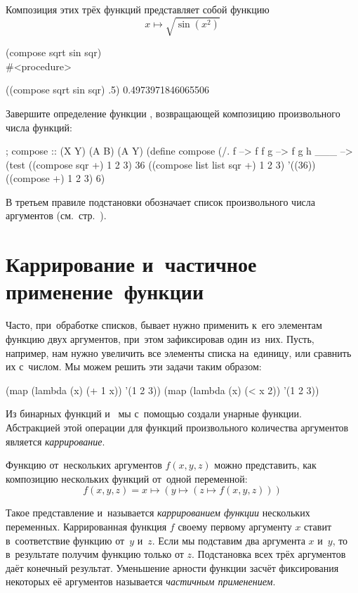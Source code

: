 \begin{example}{%
Композиция этих трёх функций представляет собой функцию $$x\mapsto\sqrt{\sin(x^2)}$$}

\REPL
  {(compose sqrt sin sqr)} 
  {\\\#<procedure>}

\REPL
  {((compose sqrt sin sqr) .5)}
  {0.4973971846065506}
\end{example}

\begin{Assignment}
Завершите определение функции , возвращающей композицию произвольного числа функций:
\begin{Specification}
; compose :: (X \arrow Y) \ddd (A \ddd \arrow B) \arrow (A \ddd \arrow Y)
(define compose
  (/. f --> f
      f g --> %
      f g h ___ --> %
(test
  ((compose sqr +) 1 2 3)            36
  ((compose list list sqr +) 1 2 3)  '((36))
  ((compose +) 1 2 3)                6)
\end{Specification}
В третьем правиле подстановки  обозначает список произвольного числа аргументов (см.~стр.~\pageref{variadic-rewrite}).
\end{Assignment}


\section[4]{Каррирование и~частичное применение~функции}%
Часто, при~обработке списков, бывает нужно применить к~его элементам функцию двух аргументов, при~этом зафиксировав один из~них. Пусть, например, нам нужно увеличить все элементы списка на~единицу, или сравнить их с~числом. Мы можем решить эти задачи таким образом:

\begin{SchemeCode}
(map (lambda (x) (+ 1 x)) '(1 2 3))
(map (lambda (x) (< x 2)) '(1 2 3))
\end{SchemeCode}

Из бинарных функций \s{+} и~\s{<} мы с~помощью  создали унарные функции. Абстракцией этой операции для функций произвольного количества аргументов является \emph{каррирование}.

Функцию от~нескольких аргументов $f(x, y, z)$ можно представить, как композицию нескольких функций от~одной переменной:$$f(x, y, z) = x \mapsto (y \mapsto (z \mapsto f (x, y, z)))$$

Такое представление и~называется \emph{каррированием функции} нескольких переменных. Каррированная функция $f$ своему первому аргументу $x$ ставит в~соответствие функцию от~$y$ и~$z$. Если мы подставим два аргумента $x$ и~$y$, то в~результате получим функцию только от $z$. Подстановка всех трёх аргументов даёт конечный результат. Уменьшение арности функции засчёт фиксирования некоторых её аргументов называется \emph{частичным применением}.


